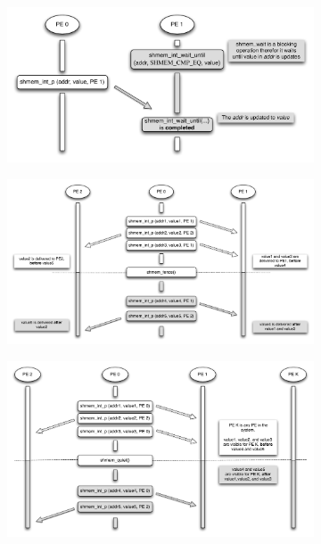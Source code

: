 \begin{figure}
        \centering
        \begin{subfigure}{0.48\textwidth}
                \includegraphics[width=\textwidth]{diagrams/updated/wait}
                \caption{}
                \label{fig:wait}
        \end{subfigure}
        \begin{subfigure}{0.48\textwidth}
                \includegraphics[width=\textwidth]{diagrams/updated/fence}
                \caption{}
                \label{fig:fence}
        \end{subfigure}
        \begin{subfigure}{0.48\textwidth}
                \includegraphics[width=\textwidth]{diagrams/updated/quiet}

\end{subfigure}
\end{figure}
